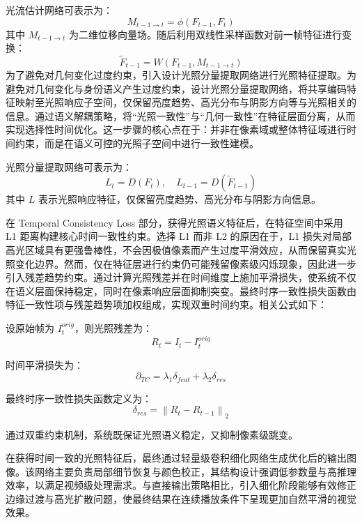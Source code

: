 光流估计网络可表示为：
\begin{equation}
M_{t-1 \to t} = \phi(F_{t-1}, F_t)
\end{equation}
其中 \(M_{t-1 \to t}\) 为二维位移向量场。随后利用双线性采样函数对前一帧特征进行变换：
\begin{equation}
\tilde{F}_{t-1} = W(F_{t-1}, M_{t-1 \to t})
\end{equation}
为了避免对几何变化过度约束，引入设计光照分量提取网络进行光照特征提取。为避免对几何变化与身份语义产生过度约束，设计光照分量提取网络，将共享编码特征映射至光照响应子空间，仅保留亮度趋势、高光分布与阴影方向等与光照相关的信息。通过语义解耦策略，将“光照一致性”与“几何一致性”在特征层面分离，从而实现选择性时间优化。这一步骤的核心点在于：并非在像素域或整体特征域进行时间约束，而是在语义可控的光照子空间中进行一致性建模。

光照分量提取网络可表示为：
\begin{equation}
L_t = D(F_t), \quad L_{t-1} = D(\tilde{F}_{t-1})
\end{equation}
其中 \(L\) 表示光照响应特征，仅保留亮度趋势、高光分布与阴影方向信息。

在 Temporal Consistency Loss 部分，获得光照语义特征后，在特征空间中采用 L1 距离构建核心时间一致性约束。选择 L1 而非 L2 的原因在于，L1 损失对局部高光区域具有更强鲁棒性，不会因极值像素而产生过度平滑效应，从而保留真实光照变化边界。然而，仅在特征层进行约束仍可能残留像素级闪烁现象，因此进一步引入残差趋势约束。通过计算光照残差并在时间维度上施加平滑损失，使系统不仅在语义层面保持稳定，同时在像素响应层面抑制突变。最终时序一致性损失函数由特征一致性项与残差趋势项加权组成，实现双重时间约束。相关公式如下：

设原始帧为 \(I_t^{orig}\)，则光照残差为：
\begin{equation}
R_t = I_t - I_t^{orig}
\end{equation}

时间平滑损失为：
\begin{equation}
\partial_{TC} = \lambda_1 \delta_{feat} + \lambda_2 \delta_{res}
\end{equation}

最终时序一致性损失函数定义为：
\begin{equation}
\delta_{res} = \left\| R_t - R_{t-1} \right\|_2
\end{equation}

通过双重约束机制，系统既保证光照语义稳定，又抑制像素级跳变。

在获得时间一致的光照特征后，最终通过轻量级卷积细化网络生成优化后的输出图像。该网络主要负责局部细节恢复与颜色校正，其结构设计强调低参数量与高推理效率，以满足视频级处理需求。与直接输出策略相比，引入细化阶段能够有效修正边缘过渡与高光扩散问题，使最终结果在连续播放条件下呈现更加自然平滑的视觉效果。


